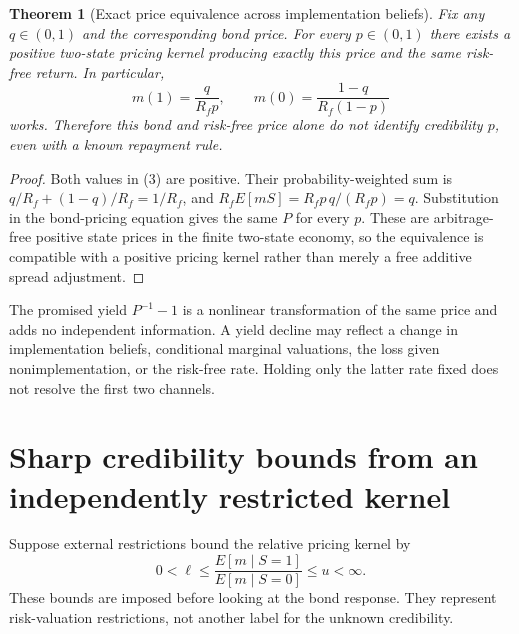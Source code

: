 \documentclass[11pt]{article}
\newtheorem{theorem}{Theorem}
\theoremstyle{definition}
\begin{document}
\begin{theorem}[Exact price equivalence across implementation beliefs]
Fix any $q\in(0,1)$ and the corresponding bond price. For every $p\in(0,1)$ there exists a positive two-state pricing kernel producing exactly this price and the same risk-free return. In particular,
\[
 m(1)=\frac{q}{R_fp},\qquad
 m(0)=\frac{1-q}{R_f(1-p)}
 \tag{3}
\]
works. Therefore this bond and risk-free price alone do not identify credibility $p$, even with a known repayment rule.
\end{theorem}
\begin{proof}
Both values in (3) are positive. Their probability-weighted sum is $q/R_f+(1-q)/R_f=1/R_f$, and $R_fE[mS]=R_fp\,q/(R_fp)=q$. Substitution in the bond-pricing equation gives the same $P$ for every $p$. These are arbitrage-free positive state prices in the finite two-state economy, so the equivalence is compatible with a positive pricing kernel rather than merely a free additive spread adjustment.
\end{proof}
The promised yield $P^{-1}-1$ is a nonlinear transformation of the same price and adds no independent information. A yield decline may reflect a change in implementation beliefs, conditional marginal valuations, the loss given nonimplementation, or the risk-free rate. Holding only the latter rate fixed does not resolve the first two channels.

\section*{Sharp credibility bounds from an independently restricted kernel}
Suppose external restrictions bound the relative pricing kernel by
\[
 0<\ell\le\frac{E[m\mid S=1]}{E[m\mid S=0]}\le u<\infty.
 \tag{4}
\]
These bounds are imposed before looking at the bond response. They represent risk-valuation restrictions, not another label for the unknown credibility.
\end{document}
